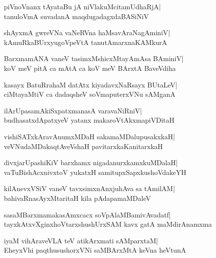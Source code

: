 \documentclass[twoside,12pt,openright]{book}
\newcounter{shloka}[chapter]
\begin{document}
\begin{shloka}%
piVnoVnanx tAyataBu jA niVlakuMcitamUdhaRjA|\\
tanuloVmA suvadanA maqdugadagxdaBASiNiV
\end{shloka}

\begin{shloka}%
shAyxmA gwreVNa vaNeRVna haMsavAraNagAminiV|\\
kAmuRkaBUrxyugoVpeVtA tanutAmarxnaKAMkurA
\end{shloka}

\begin{shloka}%
BarxmamANA vaneV tasimxMshicxMtayAmAsa BAminiV|\\
koV meV pitA ca mAtA ca koV meV BArxtA BaveVdiha
\end{shloka}

\begin{shloka}%
kasayx BatuRrahaM datAtx kiyadavxNaRsayx BUtaLeV|\\
ciMtayaMtiV ca dadaqsheV soVmaputerxVNu sAMganA
\end{shloka}

\begin{shloka}%
ilArUpasamAkiSxpatxmanasA varavaNiRniV|\\
budhasatxdApatxyeV yatanx makaroVtAkxmapiVDitaH
\end{shloka}

\begin{shloka}%
vishiSATxkAravAnumxMDaH sakamaMDalupusakxkaH|\\
veVNudaMDakaqtAveVshaH pavitarxkaKanitarxkaH
\end{shloka}

\begin{shloka}%
divxjarUpashiKiV barxhamx nigadanurxkamxkuMDalaH|\\
vaTuBishAcxnivxtoV yukatxH samitupxSapxkushoVdakeYH
\end{shloka}

\begin{shloka}%
kilAnevxVSiV vaneV tavxsimxnAnxjuhAva sa tAmilAM|\\
bahivaRnasAyxMtaritaH kila pAdapamaMDaleV
\end{shloka}

\begin{shloka}%
sasaMBarxmamakasAmxcacx soVpAlaMBamivAvadatf|\\
tayxkAtxvXginxhoVtarxshushUrxSAM kavx gatA maMdirAnamxma
\end{shloka}

\begin{shloka}%
iyaM vihAraveVLA teV atikArxmati sAMparxtaM|\\
EheyxVhi paqthusushorxVNi saMBArxMtA keVna heVtunA
\end{shloka}
\end{document}
